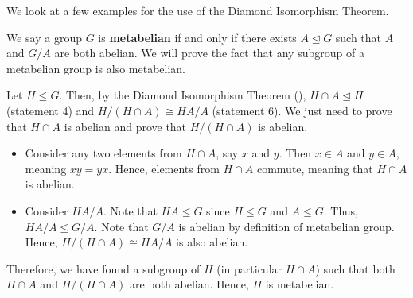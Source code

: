 We look at a few examples for the use of the Diamond Isomorphism Theorem.
\begin{example}
    We say a group $G$ is \textbf{metabelian} if and only if there exists $A \unlhd G$ such that $A$ and $G/A$ are both abelian. We will prove the fact that any subgroup of a metabelian group is also metabelian.

    Let $H \leq G$. Then, by the Diamond Isomorphism Theorem (), $H \cap A \unlhd H$ (statement 4) and $H/(H \cap A) \cong HA / A$ (statement 6). We just need to prove that $H \cap A$ is abelian and prove that $H/(H \cap A)$ is abelian.
    \begin{itemize}
        \item Consider any two elements from $H \cap A$, say $x$ and $y$. Then $x \in A$ and $y \in A$, meaning $xy = yx$. Hence, elements from $H \cap A$ commute, meaning that $H \cap A$ is abelian.
        \item Consider $HA / A$. Note that $HA \leq G$ since $H \leq G$ and $A \leq G$. Thus, $HA / A \leq G / A$. Note that $G/A$ is abelian by definition of metabelian group. Hence, $H/(H \cap A) \cong HA / A$ is also abelian.
    \end{itemize}
    Therefore, we have found a subgroup of $H$ (in particular $H \cap A$) such that both $H \cap A$ and $H/(H\cap A)$ are both abelian. Hence, $H$ is metabelian.
\end{example}

\newpage

